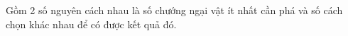 Gồm 2 số nguyên cách nhau là số chướng ngại vật ít nhất cần phá và số cách chọn khác nhau để có được kết quả đó.